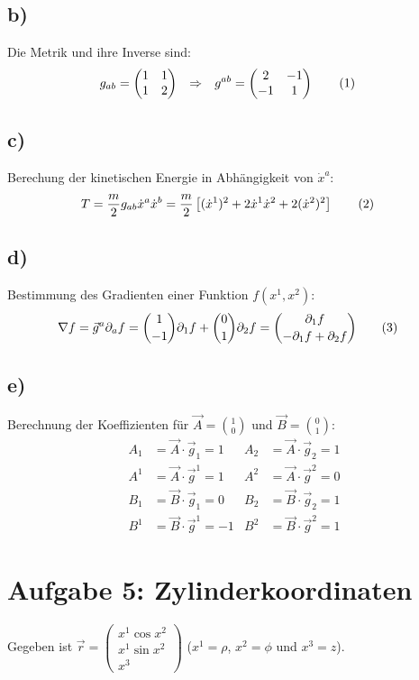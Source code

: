 \documentclass[a4paper,12pt]{article}
\newcommand\numberthis{\addtocounter{equation}{1}\tag{\theequation}}
\newcommand{\kla}{}
\begin{document}
\subsection*{b)}Die Metrik und ihre Inverse sind:
\begin{align*}
g_{ab}&=\begin{pmatrix}
1&1 \\ 1&2
\end{pmatrix}&\Rightarrow&&g^{ab}&=\begin{pmatrix}
2&-1 \\ -1&1
\end{pmatrix}\numberthis\label{eqn:Metrik}
\end{align*}
\subsection*{c)}Berechung der kinetischen Energie in Abhängigkeit von $\dot{x}^a$:
\begin{align*}
T&=\frac{m}{2}g_{ab}\dot{x}^a\dot{x}^b=\frac{m}{2}\kla\left[ {(\dot{x}^1)^2+2\dot{x}^1\dot{x}^2+2(\dot{x}^2)^2} \right]\numberthis\label{eqn:Kinetische Energie von xdot oben a}
\end{align*}
\subsection*{d)}Bestimmung des Gradienten einer Funktion $f(x^1,x^2)$:
\begin{align*}
\nabla f&=\vec{g}^a\partial_a f=\binom{1}{-1}\partial_1f+\binom{0}{1}\partial_2f=\binom{\partial_1f}{-\partial_1f+\partial_2f}\numberthis\label{eqn:Gradient}
\end{align*}
\subsection*{e)}Berechnung der Koeffizienten für $\vec{A}=\binom{1}{0}$ und $\vec{B}=\binom{0}{1}$:
\begin{align*}
A_1&=\vec{A}\cdot\vec{g}_1=1&A_2&=\vec{A}\cdot\vec{g}_2=1\\
A^1&=\vec{A}\cdot\vec{g}^1=1&A^2&=\vec{A}\cdot\vec{g}^2=0\\
B_1&=\vec{B}\cdot\vec{g}_1=0&B_2&=\vec{B}\cdot\vec{g}_2=1\\
B^1&=\vec{B}\cdot\vec{g}^1=-1&B^2&=\vec{B}\cdot\vec{g}^2=1
\end{align*}
\section*{Aufgabe 5: Zylinderkoordinaten}
Gegeben ist $\vec{r}=\begin{pmatrix}
x^1\cos x^2 \\ x^1\sin x^2 \\ x^3
\end{pmatrix}$ ($x^1=\rho$, $x^2=\phi$ und $x^3=z$).
\end{document}
